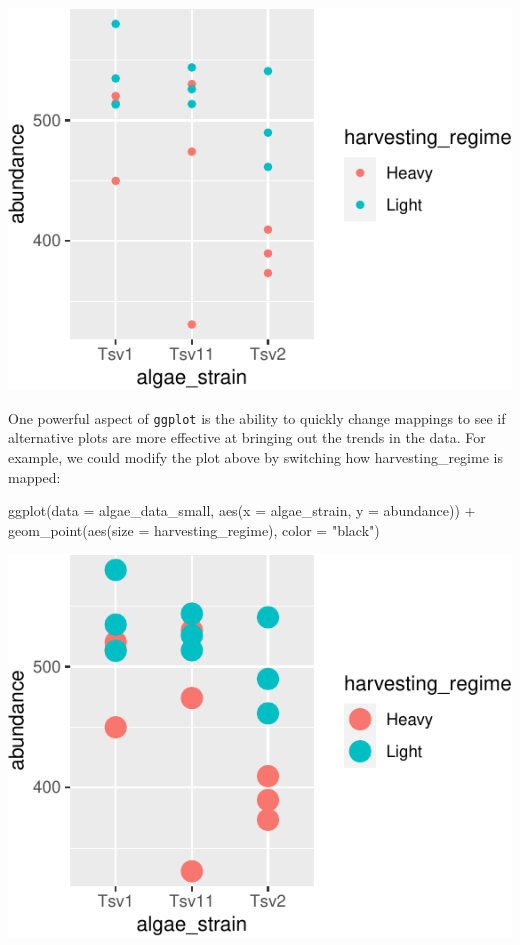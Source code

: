 \documentclass[
]{krantz}
\newenvironment{Shaded}{\begin{snugshade}}{\end{snugshade}}
\newcommand{\AttributeTok}[1]{\textcolor[rgb]{0.77,0.63,0.00}{#1}}
\newcommand{\FunctionTok}[1]{\textcolor[rgb]{0.00,0.00,0.00}{#1}}
\newcommand{\NormalTok}[1]{#1}
\newcommand{\SpecialCharTok}[1]{\textcolor[rgb]{0.00,0.00,0.00}{#1}}
\newcommand{\StringTok}[1]{\textcolor[rgb]{0.31,0.60,0.02}{#1}}
\begin{document}
\begin{center}\includegraphics{index_files/figure-latex/unnamed-chunk-24-1} \end{center}

One powerful aspect of \texttt{ggplot} is the ability to quickly change mappings to see if alternative plots are more effective at bringing out the trends in the data. For example, we could modify the plot above by switching how harvesting\_regime is mapped:

\begin{Shaded}
\begin{Highlighting}[]
\FunctionTok{ggplot}\NormalTok{(}\AttributeTok{data =}\NormalTok{ algae\_data\_small, }\FunctionTok{aes}\NormalTok{(}\AttributeTok{x =}\NormalTok{ algae\_strain, }\AttributeTok{y =}\NormalTok{ abundance)) }\SpecialCharTok{+}
  \FunctionTok{geom\_point}\NormalTok{(}\FunctionTok{aes}\NormalTok{(}\AttributeTok{size =}\NormalTok{ harvesting\_regime), }\AttributeTok{color =} \StringTok{"black"}\NormalTok{)}
\end{Highlighting}
\end{Shaded}

\begin{center}\includegraphics{index_files/figure-latex/unnamed-chunk-25-1} \end{center}
\end{document}
